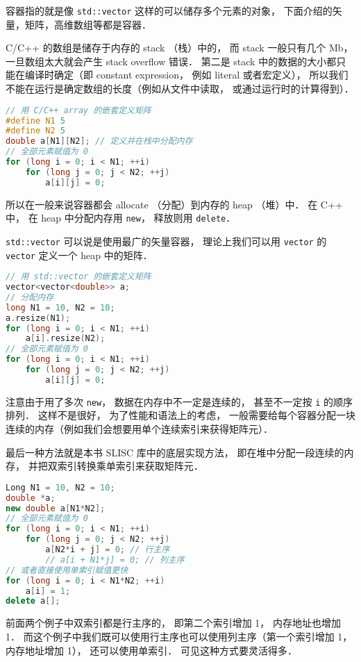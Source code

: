 


容器指的就是像 \verb|std::vector| 这样的可以储存多个元素的对象， 下面介绍的矢量，矩阵，高维数组等都是容器．

C/C++ 的数组是储存于内存的 stack （栈）中的， 而 stack 一般只有几个 Mb， 一旦数组太大就会产生 stack overflow 错误． 第二是 stack 中的数据的大小都只能在编译时确定（即 constant expression， 例如 literal 或者宏定义）， 所以我们不能在运行是确定数组的长度（例如从文件中读取， 或通过运行时的计算得到）．
\begin{lstlisting}[language=cpp]
// 用 C/C++ array 的嵌套定义矩阵
#define N1 5
#define N2 5
double a[N1][N2]; // 定义并在栈中分配内存
// 全部元素赋值为 0
for (long i = 0; i < N1; ++i)
    for (long j = 0; j < N2; ++j)
        a[i][j] = 0;
\end{lstlisting}

所以在一般来说容器都会 allocate （分配）到内存的 heap （堆）中． 在 C++ 中， 在 heap 中分配内存用 \verb|new|， 释放则用 \verb|delete|．

\verb|std::vector| 可以说是使用最广的矢量容器， 理论上我们可以用 \verb|vector| 的 \verb|vector| 定义一个 heap 中的矩阵．
\begin{lstlisting}[language=cpp]
// 用 std::vector 的嵌套定义矩阵
vector<vector<double>> a;
// 分配内存
long N1 = 10, N2 = 10;
a.resize(N1);
for (long i = 0; i < N1; ++i)
    a[i].resize(N2);
// 全部元素赋值为 0
for (long i = 0; i < N1; ++i)
    for (long j = 0; j < N2; ++j)
        a[i][j] = 0;
\end{lstlisting}
注意由于用了多次 \verb|new|， 数据在内存中不一定是连续的， 甚至不一定按 \verb|i| 的顺序排列． 这样不是很好， 为了性能和语法上的考虑， 一般需要给每个容器分配一块连续的内存（例如我们会想要用单个连续索引来获得矩阵元）．

最后一种方法就是本书 SLISC 库中的底层实现方法， 即在堆中分配一段连续的内存， 并把双索引转换乘单索引来获取矩阵元．
\begin{lstlisting}[language=cpp]
Long N1 = 10, N2 = 10;
double *a;
new double a[N1*N2];
// 全部元素赋值为 0
for (long i = 0; i < N1; ++i)
    for (long j = 0; j < N2; ++j)
        a[N2*i + j] = 0; // 行主序
        // a[i + N1*j] = 0; // 列主序
// 或者直接使用单索引赋值更快
for (long i = 0; i < N1*N2; ++i)
    a[i] = 1;
delete a[];
\end{lstlisting}
前面两个例子中双索引都是行主序的， 即第二个索引增加 1， 内存地址也增加 1． 而这个例子中我们既可以使用行主序也可以使用列主序（第一个索引增加 1， 内存地址增加 1）， 还可以使用单索引． 可见这种方式要灵活得多．

